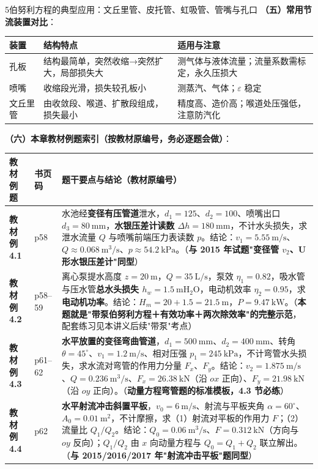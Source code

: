 \begin{kaodian}{5}{伯努利方程的典型应用：文丘里管、皮托管、虹吸管、管嘴与孔口}
\textbf{（五）常用节流装置对比}：
\begin{center}
\begin{tabularx}{\textwidth}{@{}lXX@{}}
\toprule
装置 & 结构特点 & 适用与注意 \\
\midrule
孔板 & 结构最简单，突然收缩→突然扩大，局部损失大 & 测气体与液体流量；流量系数需标定，永久压损大 \\
喷嘴 & 收缩段光滑，损失较孔板小 & 测蒸汽、气体；$\varepsilon$ 稳定 \\
文丘里管 & 由收敛段、喉道、扩散段组成，损失最小 & 精度高、造价高；喉道处压强低，注意防汽化 \\
\bottomrule
\end{tabularx}
\end{center}

\textbf{（六）本章教材例题索引（按教材原编号，务必逐题会做）}：
\begin{center}
\begin{tabularx}{\textwidth}{@{}llX@{}}
\toprule
教材例题 & 书页码 & 题干要点与结论（教材原编号） \\
\midrule
\textbf{教材例 4.1} & p58 & 水池经\textbf{变径有压管道}泄水，$d_1=125$、$d_2=100$、喷嘴出口 $d_3=80\ \mathrm{mm}$，\textbf{水银压差计读数 $\Delta h=180\ \mathrm{mm}$}，不计水头损失，求泄水流量 $Q$ 与喷嘴前端压力表读数 $p$。结论：$v_1=5.55\ \mathrm{m/s}$、$Q\approx0.068\ \mathrm{m^3/s}$、$p\approx54.2\ \mathrm{kPa}$。（\textbf{与 2015 年试题"变径管 $v_2$、U 形水银压差计"同型}）\\
\textbf{教材例 4.2} & p58--59 & 离心泵提水高度 $z=20\ \mathrm{m}$，$Q=35\ \mathrm{L/s}$，泵效 $\eta_1=0.82$，吸水管与压水管\textbf{总水头损失 $h_w=1.5\ \mathrm{mH_2O}$}，电动机效率 $\eta_2=0.95$，求\textbf{电动机功率}。结论：$H_m=20+1.5=21.5\ \mathrm{m}$，$P=9.47\ \mathrm{kW}$。（\textbf{本题就是"带泵伯努利方程＋有效功率＋两次除效率"的完整示范}，配套练习见本讲义后续"带泵"考点）\\
\textbf{教材例 4.3} & p61--62 & \textbf{水平放置的变径弯曲管道}，$d_1=500\ \mathrm{mm}$、$d_2=400\ \mathrm{mm}$、转角 $\theta=45^{\circ}$、$v_1=1.2\ \mathrm{m/s}$、相对压强 $p_1=245\ \mathrm{kPa}$，不计弯管水头损失，求水流对弯管的作用力分量 $F_x$、$F_y$。结论：$v_2=1.875\ \mathrm{m/s}$、$Q=0.236\ \mathrm{m^3/s}$、$F_x=26.38\ \mathrm{kN}$（沿 $ox$ 正向）、$F_y=21.98\ \mathrm{kN}$（沿 $oy$ 正向）。（\textbf{动量方程弯管题的标准模板，4.3 节必练}）\\
\textbf{教材例 4.4} & p62 & \textbf{水平射流冲击斜置平板}，$v_0=6\ \mathrm{m/s}$、射流与平板夹角 $\alpha=60^{\circ}$、$A_0=0.01\ \mathrm{m^2}$，不计摩擦，求（1）射流对平板的作用力 $F$；（2）流量比 $Q_1/Q_2$。结论：$Q_0=0.06\ \mathrm{m^3/s}$、$F=0.312\ \mathrm{kN}$（方向与 $oy$ 反向）；$Q_1/Q_2$ 由 $x$ 向动量方程与 $Q_0=Q_1+Q_2$ 联立解出。（\textbf{与 2015/2016/2017 年"射流冲击平板"题同型}）\\

\end{tabularx}
\end{center}
\end{kaodian}
